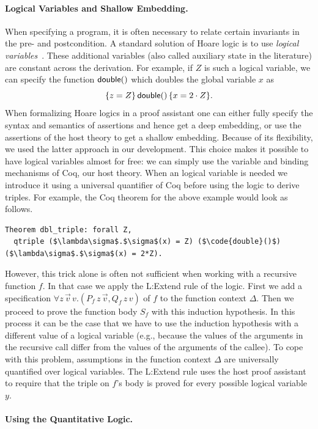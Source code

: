 \documentclass[nocopyrightspace,preprint,pldi]{sigplanconf-pldi15}
\begin{document}
{\paragraph{Logical Variables and Shallow Embedding.}

When specifying a program, it is often necessary to relate certain
invariants in the pre- and postcondition.  A standard solution of Hoare
logic is to use \emph{logical variables}~\cite{Kleymann99}.  These
additional variables (also called auxiliary state in the literature)
are constant across the derivation.  For example, if $Z$ is such
a logical variable, we can specify the function $\mathsf{double}()$
which doubles the global variable $x$ as
$$
  \{z = Z\}\, \mathsf{double}()\, \{x = 2 \cdot Z\}.
$$
%
When formalizing Hoare logics in a proof assistant one can either
fully specify the syntax and semantics of assertions and hence get a
deep embedding, or use the assertions of the host theory to get a
shallow embedding.  Because of its flexibility, we used the latter
approach in our development.  This choice makes it possible to have
logical variables almost for free: we can simply use the variable and
binding mechanisms of Coq, our host theory.  When an logical variable
is needed we introduce it using a universal quantifier of Coq before
using the logic to derive triples.  For example, the Coq theorem for
the above example would look as follows.
%
\begin{lstlisting}
Theorem dbl_triple: forall Z,
  qtriple ($\lambda\sigma$.$\sigma$(x) = Z) ($\code{double}()$) ($\lambda\sigma$.$\sigma$(x) = 2*Z).
\end{lstlisting}
%
However, this trick alone is often not sufficient when working with a
recursive function $f$.  In that case we apply the {\sc L:Extend} rule
of the logic.  First we add a specification $\forall z\,\vec
v\,v.(P_f\,z\,\vec v, Q_f\,z\,v)$ of $f$ to the function context
$\Delta$.  Then we proceed to prove the function body $S_f$ with this
induction hypothesis.  In this process it can be the case that we have
to use the induction hypothesis with a different value of a logical
variable (e.g., because the values of the arguments in the recursive
call differ from the values of the arguments of the callee).  To cope
with this problem, assumptions in the function context $\Delta$ are
universally quantified over logical variables.  The {\sc L:Extend}
rule uses the host proof assistant to require that the triple on $f$'s
body is proved for every possible logical variable $y$.

\paragraph{Using the Quantitative Logic.}

}
\end{document}
